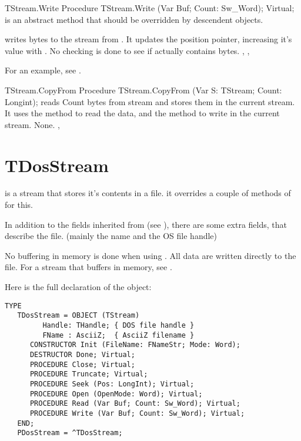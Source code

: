 \html{}

\begin{procedure}{TStream.Write}
\Declaration
Procedure TStream.Write (Var Buf; Count: Sw\_Word); Virtual;
\Description
{} is an abstract method that should be overridden by descendent
objects.

 writes  bytes to the stream from .
It updates the position pointer, increasing it's value with . 
\Errors
No checking is done to see if  actually contains  bytes. 
\SeeAlso
{}, ,
\end{procedure}

For an example, see .

\begin{procedure}{TStream.CopyFrom}
\Declaration
Procedure TStream.CopyFrom (Var S: TStream; Count: Longint);
\Description
{} reads Count bytes from stream  and stores them
in the current stream. It uses the  method
to read the data, and the  method to
write in the current stream.
\Errors
None.
\SeeAlso
{}, 
\end{procedure}

\html{}

\section{TDosStream}
\label{se:TDosStream}

 is a stream that stores it's contents in a file.
it overrides a couple of methods of  for this.

In addition to the fields inherited from  (see ),
there are some extra fields, that describe the file. (mainly the name and
the OS file handle)

No buffering in memory is done when using . 
All data are written directly to the file. For a stream that buffers 
in memory, see .

Here is the full declaration of the  object:
\begin{verbatim}
TYPE
   TDosStream = OBJECT (TStream)
         Handle: THandle; { DOS file handle }
         FName : AsciiZ;  { AsciiZ filename }
      CONSTRUCTOR Init (FileName: FNameStr; Mode: Word);
      DESTRUCTOR Done; Virtual;
      PROCEDURE Close; Virtual;
      PROCEDURE Truncate; Virtual;
      PROCEDURE Seek (Pos: LongInt); Virtual;
      PROCEDURE Open (OpenMode: Word); Virtual;
      PROCEDURE Read (Var Buf; Count: Sw_Word); Virtual;
      PROCEDURE Write (Var Buf; Count: Sw_Word); Virtual;
   END;
   PDosStream = ^TDosStream;
\end{verbatim}

